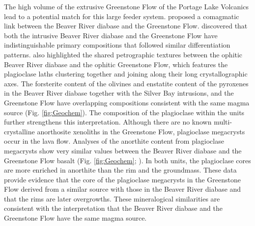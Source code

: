 The high volume of the extrusive Greenstone Flow of the Portage Lake Volcanics lead to a potential match for this large feeder system. \cite{Doyle2016a} proposed a comagmatic link between the Beaver River diabase and the Greenstone Flow. \cite{Doyle2016a} discovered that both the intrusive Beaver River diabase and the Greenstone Flow have indistinguishable primary compositions that followed similar differentiation patterns. \cite{Doyle2016a} also highlighted the shared petrographic textures between the ophitic Beaver River diabase and the ophitic Greenstone Flow, which features the plagioclase laths clustering together and joining along their long crystallographic axes. The forsterite content of the olivines and enstatite content of the pyroxenes in the Beaver River diabase together with the Silver Bay intrusions, and the Greenstone Flow have overlapping compositions consistent with the same magma source (Fig. \ref{fig:Geochem}). The composition of the plagioclase within the units further strengthens this interpretation. Although there are no known multi-crystalline anorthosite xenoliths in the Greenstone Flow, plagioclase megacrysts occur in the lava flow. Analyses of the anorthite content from plagioclase megacrysts show very similar values between the Beaver River diabase and the Greenstone Flow basalt (Fig. \ref{fig:Geochem}; \citealp{Doyle2016a}). In both units, the plagioclase cores are more enriched in anorthite than the rim and the groundmass. These data provide evidence that the core of the plagioclase megacrysts in the Greenstone Flow derived from a similar source with those in the Beaver River diabase and that the rims are later overgrowths. These mineralogical similarities are consistent with the interpretation that the Beaver River diabase and the Greenstone Flow have the same magma source. 


